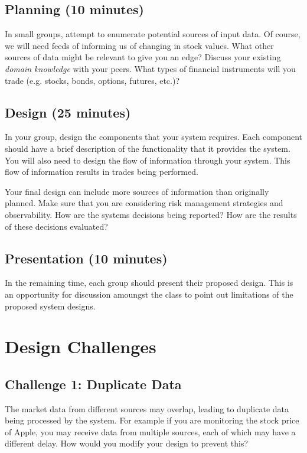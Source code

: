 \documentclass{csse4400}
\begin{document}
\subsection*{Planning (10 minutes)}
In small groups,
attempt to enumerate potential sources of input data.
Of course,
we will need feeds of informing us of changing in stock values.
What other sources of data might be relevant to give you an edge?
Discuss your existing \textsl{domain knowledge} with your peers.
What types of financial instruments will you trade (e.g. stocks, bonds, options, futures, etc.)?

\subsection*{Design (25 minutes)}

In your group,
design the components that your system requires.
Each component should have a brief description of the functionality that it provides the system.
You will also need to design the flow of information through your system.
This flow of information results in trades being performed.

Your final design can include more sources of information than originally planned.
Make sure that you are considering risk management strategies and observability.
How are the systems decisions being reported?
How are the results of these decisions evaluated?

\subsection*{Presentation (10 minutes)}

In the remaining time,
each group should present their proposed design.
This is an opportunity for discussion amoungst the class to point out limitations of the proposed system designs.

\section{Design Challenges}

\subsection*{Challenge 1: Duplicate Data}
The market data from different sources may overlap,
leading to duplicate data being processed by the system.
For example if you are monitoring the stock price of Apple,
you may receive data from multiple sources,
each of which may have a different delay.
How would you modify your design to prevent this?
\end{document}
